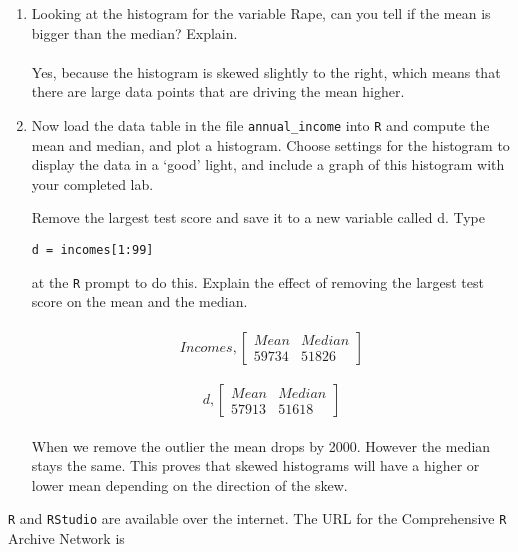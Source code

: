 \documentclass{report}
\begin{document}
\begin{enumerate}
      
\item Looking at the histogram for the variable Rape, can you tell if
the mean is bigger than the median?  Explain.\\\\
 Yes, because the histogram is skewed slightly to the right, which means that there are large data points that are driving the mean higher.


\item Now load the data table in the file {\tt annual\_income} into
{\tt R} and compute the mean and median, and plot a histogram. 
Choose settings for the histogram to display the data in a `good'
light, and include a graph of this histogram with your completed
lab. 

Remove the largest test score and save it to a new variable called d.  Type

\hskip 1cm {\tt d = incomes[1:99]}

at the {\tt R} prompt to do this.  Explain the effect of removing the
largest test score on the mean and the median.\\\\
\begin{equation}
Incomes, 
\begin{bmatrix}
Mean&Median\\ 
 59734&51826
\end{bmatrix}
\end{equation}
\\

\begin{equation}
d, 
\begin{bmatrix}
Mean&Median\\ 
 57913&51618
\end{bmatrix}
\end{equation}
\\
When we remove the outlier the mean drops by 2000. However the median stays the same. This proves that skewed histograms will have a higher or lower mean depending on the direction of the skew.







\end{enumerate}
 
 \newpage

{\tt R} and {\tt RStudio} are available over the internet.  The URL for the Comprehensive {\tt R}
Archive Network is
\end{document}
